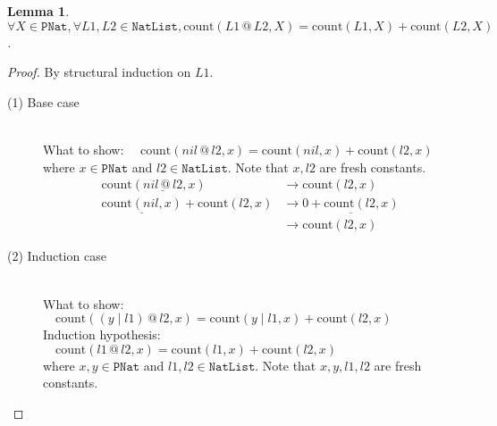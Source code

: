 \documentclass[12pt, a4paper]{article}
\newtheorem{lemma}[theorem]{Lemma}
\newcommand{\rel}[1]{\mathrel{#1}}
\newcommand{\rmx}[1]{\mathrm{#1}}
\newcommand{\larrow}{\longrightarrow}
\newcommand{\under}{\underline}
\begin{document}
\begin{lemma}
\label{lm1}
$\forall X \in \mathtt{PNat}, \forall L1, L2 \in \mathtt{NatList}, \rmx{count}(L1 \rel{@} L2, X) = \rmx{count}(L1, X) + \rmx{count}(L2, X)$.
\end{lemma}
\begin{proof}
By structural induction on $L1$.
\begin{description}
\item[(1) Base case]~\\
\noindent
What to show: $\quad \rmx{count}(nil \rel{@} l2, x) = \rmx{count}(nil, x) + \rmx{count}(l2, x)$ \\
where $x \in \mathtt{PNat}$ and $l2 \in \mathtt{NatList}$.
Note that $x, l2$ are fresh constants.
\begin{align*}
\rmx{count}(\under{nil \rel{@} l2}, x) 
	&\larrow \rmx{count}(l2, x)  \tag{by @1} \\
\under{\rmx{count}(nil, x)} + \rmx{count}(l2, x)
	&\larrow \under{0 + \rmx{count}(l2, x)} \tag{by cnt1} \\
	&\larrow \rmx{count}(l2, x) \tag{by +1}
\end{align*}

\item[(2) Induction case]~\\
What to show: $\quad \rmx{count}((y \mid l1) \rel{@} l2, x) = \rmx{count}(y \mid l1, x) + \rmx{count}(l2, x)$ \\
Induction hypothesis: $\quad \rmx{count}(l1 \rel{@} l2, x) = \rmx{count}(l1, x) + \rmx{count}(l2, x)$  \\
where $x, y \in \mathtt{PNat}$ and $l1, l2 \in \mathtt{NatList}$.
Note that $x, y, l1, l2$ are fresh constants.


\end{description}
\end{proof}
\end{document}

